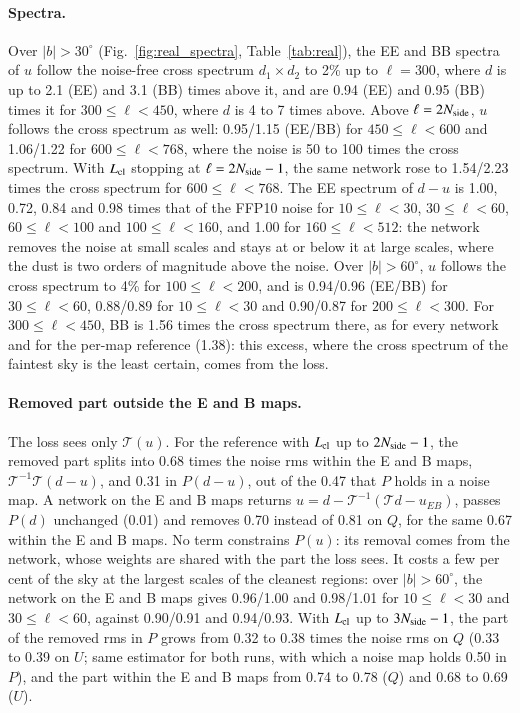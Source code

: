 \documentclass{aa}
\newcommand{\nside}{N_{\rm side}}
\begin{document}
\paragraph{Spectra.} Over $|b|>30^\circ$ (Fig.~\ref{fig:real_spectra}, Table~\ref{tab:real}), the EE and BB spectra of $u$ follow the noise-free cross spectrum $d_1\times d_2$ to 2\% up to $\ell=300$, where $d$ is up to 2.1 (EE) and 3.1 (BB) times above it, and are 0.94 (EE) and 0.95 (BB) times it for $300\le\ell<450$, where $d$ is 4 to 7 times above. Above $\ell=2\nside$, $u$ follows the cross spectrum as well: 0.95/1.15 (EE/BB) for $450\le\ell<600$ and 1.06/1.22 for $600\le\ell<768$, where the noise is 50 to 100 times the cross spectrum. With $L_{\rm cl}$ stopping at $\ell=2\nside-1$, the same network rose to 1.54/2.23 times the cross spectrum for $600\le\ell<768$. The EE spectrum of $d-u$ is 1.00, 0.72, 0.84 and 0.98 times that of the FFP10 noise for $10\le\ell<30$, $30\le\ell<60$, $60\le\ell<100$ and $100\le\ell<160$, and 1.00 for $160\le\ell<512$: the network removes the noise at small scales and stays at or below it at large scales, where the dust is two orders of magnitude above the noise. Over $|b|>60^\circ$, $u$ follows the cross spectrum to 4\% for $100\le\ell<200$, and is 0.94/0.96 (EE/BB) for $30\le\ell<60$, 0.88/0.89 for $10\le\ell<30$ and 0.90/0.87 for $200\le\ell<300$. For $300\le\ell<450$, BB is 1.56 times the cross spectrum there, as for every network and for the per-map reference (1.38): this excess, where the cross spectrum of the faintest sky is the least certain, comes from the loss.

\paragraph{Removed part outside the E and B maps.} The loss sees only $\mathcal{T}(u)$. For the reference with $L_{\rm cl}$ up to $2\nside-1$, the removed part splits into 0.68 times the noise rms within the E and B maps, $\mathcal{T}^{-1}\mathcal{T}(d-u)$, and 0.31 in $P(d-u)$, out of the 0.47 that $P$ holds in a noise map. A network on the E and B maps returns $u=d-\mathcal{T}^{-1}(\mathcal{T}d-u_{EB})$, passes $P(d)$ unchanged (0.01) and removes 0.70 instead of 0.81 on $Q$, for the same 0.67 within the E and B maps. No term constrains $P(u)$: its removal comes from the network, whose weights are shared with the part the loss sees. It costs a few per cent of the sky at the largest scales of the cleanest regions: over $|b|>60^\circ$, the network on the E and B maps gives 0.96/1.00 and 0.98/1.01 for $10\le\ell<30$ and $30\le\ell<60$, against 0.90/0.91 and 0.94/0.93. With $L_{\rm cl}$ up to $3\nside-1$, the part of the removed rms in $P$ grows from 0.32 to 0.38 times the noise rms on $Q$ (0.33 to 0.39 on $U$; same estimator for both runs, with which a noise map holds 0.50 in $P$), and the part within the E and B maps from 0.74 to 0.78 ($Q$) and 0.68 to 0.69 ($U$).
\end{document}
